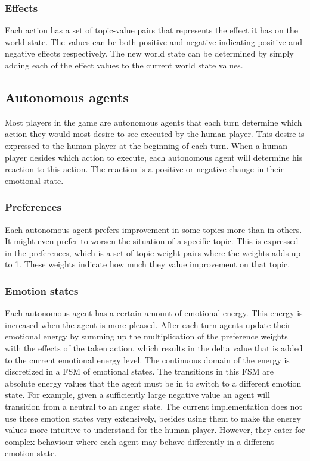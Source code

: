 \documentclass[11pt,a4paper]{article}
\begin{document}
    \subsubsection{Effects}
      Each action has a set of topic-value pairs that represents the effect it has on the world state. The values can be both positive and negative indicating positive and negative effects respectively. The new world state can be determined by simply adding each of the effect values to the current world state values.
  \subsection{Autonomous agents}
    Most players in the game are autonomous agents that each turn determine which action they would most desire to see executed by the human player. This desire is expressed to the human player at the beginning of each turn. When a human player desides which action to execute, each autonomous agent will determine his reaction to this action. The reaction is a positive or negative change in their emotional state.
    \subsubsection{Preferences}
      Each autonomous agent prefers improvement in some topics more than in others. It might even prefer to worsen the situation of a specific topic. This is expressed in the preferences, which is a set of topic-weight pairs where the weights adds up to 1. These weights indicate how much they value improvement on that topic.
    \subsubsection{Emotion states}
      Each autonomous agent has a certain amount of emotional energy. This energy is increased when the agent is more pleased. After each turn agents update their emotional energy by summing up the multiplication of the preference weights with the effects of the taken action, which results in the delta value that is added to the current emotional energy level. The continuous domain of the energy is discretized in a FSM of emotional states. The transitions in this FSM are absolute energy values that the agent must be in to switch to a different emotion state. For example, given a sufficiently large negative value an agent will transition from a neutral to an anger state. The current implementation does not use these emotion states very extensively, besides using them to make the energy values more intuitive to understand for the human player. However, they cater for complex behaviour where each agent may behave differently in a different emotion state.
\end{document}
